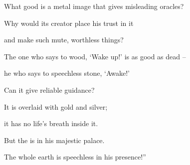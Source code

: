 {\par }{\Q What good is a metal image
that
gives misleading
oracles?

\par }{\Q Why would its creator
place his trust
in
it
\par }{\Q and make
such mute,
worthless things?
\par }{\Q {}The one
who says
to wood,
‘Wake
up!’ is as good as dead –
\par }{\Q he who
says to speechless
stone,
‘Awake!’
\par }{\Q Can it give reliable guidance?

\par }{\Q It is
overlaid
with gold
and silver;
\par }{\Q it has no
life’s
breath
inside it.
\par }{\Q {}But the
{}
is in his majestic
palace.
\par }{\Q The whole
earth
is speechless
in his presence!”

\par }
